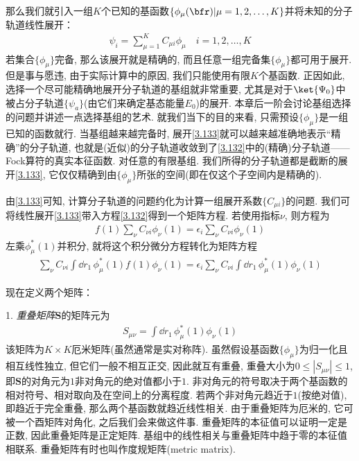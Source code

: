 那么我们就引入一组$K$个已知的基函数$\{\phi_\mu(\bfr)|\mu=1,2,\ldots,K\}$并将未知的分子轨道线性展开：
\begin{align}
	\label{3.133}
	\psi_i = \sum_{\mu=1}^{K}C_{\mu i}\phi_\mu\quad i = 1,2,\ldots,K
\end{align}
若集合$\{\phi_\mu\}$完备, 
那么该展开就是精确的, 
而且任意一组完备集$\{\phi_\mu\}$都可用于展开. 
但是事与愿违, 
由于实际计算中的原因, 
我们只能使用有限$K$个基函数. 
正因如此, 
选择一个尽可能精确地展开分子轨道的基组就非常重要, 
尤其是对于$\ket{\Psi_0}$中被占分子轨道$\{\psi_a\}$(由它们来确定基态能量$E_0$)的展开. 
本章后一阶会讨论基组选择的问题并讲述一点选择基组的艺术. 
就我们当下的目的来看, 
只需预设$\{\phi_\mu\}$是一组已知的函数就行. 
当基组越来越完备时, 
展开\autoref{3.133}就可以越来越准确地表示“精确”的分子轨道, 
也就是(近似)的分子轨道收敛到了\autoref{3.132}中的(精确)分子轨道——Fock算符的真实本征函数. 
对任意的有限基组. 
我们所得的分子轨道都是截断的展开\autoref{3.133}, 
它仅仅精确到由$\{\phi_\mu\}$所张的空间(即在仅这个子空间内是精确的).


由\autoref{3.133}可知, 
计算\hft 分子轨道的问题约化为计算一组展开系数$\{C_{\mu i} \}$的问题. 
我们可将线性展开\autoref{3.133}带入\hft 方程\autoref{3.132}得到一个矩阵方程. 
若使用指标$\nu$, 
则方程为
\begin{align}
	f(1) \sum_\nu C_{\nu i}\phi_\nu(1) = \epsilon_i\sum_\nu C_{\nu i}\phi_\nu(1) 
\end{align}
左乘$\phi_\mu^*(1)$并积分, 
就将这个积分微分方程转化为矩阵方程
\begin{align}
	\label{3.135}
	\sum_\nu C_{\nu i}\int\dd{r}_1\,\phi_\mu^*(1)f(1)\phi_\nu(1) = \epsilon_i\sum_\nu C_{\nu i}\int\dd{r}_1\,\phi_\mu^*(1)\phi_\nu(1)
\end{align}

现在定义两个矩阵：

1. \emph{重叠矩阵$\mathbf{S}$}的矩阵元为
\begin{align}
	\label{3.136}
	S_{\mu\nu}=\int\dd{r}_1\,\phi_\mu^*(1)\phi_\nu(1)
\end{align}
该矩阵为$K\times K$厄米矩阵(虽然通常是实对称阵). 
虽然假设基函数$\{\phi_\mu\}$为归一化且相互线性独立, 
但它们一般不相互正交, 
因此就互有重叠, 
重叠大小为$0\leqslant|S_{\mu\nu}|\leqslant1$, 
即$\mathbf{S}$的对角元为$1$非对角元的绝对值都小于$1$. 
非对角元的符号取决于两个基函数的相对符号、相对取向及在空间上的分离程度. 
若两个非对角元趋近于$1$(按绝对值), 
即趋近于完全重叠, 
那么两个基函数就趋近线性相关. 
由于重叠矩阵为厄米的, 
它可被一个酉矩阵对角化, 
之后我们会来做这件事. 
重叠矩阵的本征值可以证明一定是正数, 
因此重叠矩阵是正定矩阵. 
基组中的线性相关与重叠矩阵中趋于零的本征值相联系. 
重叠矩阵有时也叫作度规矩阵(metric matrix). 



